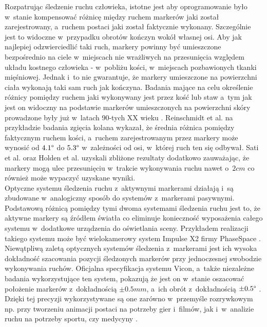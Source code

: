 Rozpatrując śledzenie ruchu człowieka, istotne jest aby oprogramowanie było w~stanie kompensować różnicę między ruchem markerów jaki został zarejestrowany, a~ruchem postaci jaki został faktycznie wykonany. Szczególnie jest to widoczne w~przypadku obrotów kończyn wokół własnej osi. Aby jak najlepiej odzwierciedlić taki ruch, markery powinny być umieszczone bezpośrednio na ciele w~miejscach nie wrażliwych na przesunięcia względem układu kostnego człowieka - w~pobliżu kości, w~miejscach pozbawionych tkanki mięśniowej. Jednak i~to nie gwarantuje, że markery umieszczone na powierzchni ciała wykonają taki sam ruch jak kończyna. Badania mające na celu określenie różnicy pomiędzy ruchem jaki wykonywany jest przez kość lub staw a~tym jak jest on widoczny na podstawie markerów umieszczonych na powierzchni skóry prowadzone były już w~latach 90-tych XX wieku \cite{Sati2016,Reinschmidt2016,Holden2016}. Reinschmidt et al. \cite{Reinschmidt2016} na przykładzie badania zgięcia kolana wykazał, że średnia różnica pomiędzy faktycznym ruchem kości, a~ruchem zarejestrowanym przez markery może wynosić od $4.1\degree$ do $5.3\degree$ w~zależności od osi, w~której ruch ten się odbywał. Sati et al. \cite{Sati2016} oraz Holden et al. \cite{Holden2016} uzyskali zbliżone rezultaty dodatkowo zauważając, że markery mogą ulec przesunięciu w~trakcie wykonywania ruchu nawet o~$2cm$ \cite{Sati2016} co również może wypaczyć uzyskane wyniki.\\ 

Optyczne systemu śledzenia ruchu z~aktywnymi markerami działają i~są zbudowane w~analogiczny sposób do systemów z~markerami pasywnymi. Podstawową różnicą pomiędzy tymi dwoma systemami śledzenia ruchu jest to, że aktywne markery są źródłem światła co eliminuje konieczność wyposażenia całego systemu w~dodatkowe urządzenia do oświetlania sceny. Przykładem realizacji takiego systemu może być wielokamerowy system Impulse X2 firmy PhaseSpace \cite{PhaseSpaceWebsite}.\\

Niewątpliwą zaletą optycznych systemów śledzenia z~markerami jest ich wysoka dokładność szacowania pozycji śledzonych markerów przy jednoczesnej swobodzie wykonywania ruchów. Oficjalna specyfikacja systemu Vicon, a~także niezależne badania wykorzystujące ten system, pokazują że jest on w~stanie oszacować położenie markerów z~dokładnością $\pm0.5mm$, a~ich obrót z~dokładnością $\pm0.5 \degree$ \cite{ViconSpec, Windolf2008}. Dzięki tej precyzji wykorzystywane są one zarówno w~przemyśle rozrywkowym np. przy tworzeniu animacji postaci na potrzeby gier i~filmów, jak i~w~analizie ruchu na potrzeby sportu, czy medycyny \cite{Perry2012, Even-zohar1984}. 

